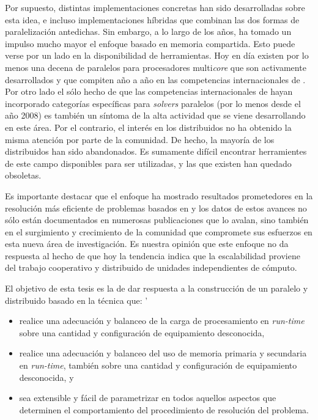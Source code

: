 \newcommand{\mcore}{multi\emph{core}\xspace}
\newcommand{\solvers}{\emph{solvers}\xspace}

Por supuesto, distintas implementaciones concretas han sido desarrolladas
sobre esta idea, e incluso implementaciones híbridas que combinan las dos
formas de paralelización antedichas. Sin embargo, a lo
largo de los años, ha tomado un impulso mucho mayor el enfoque basado en
memoria compartida. Esto puede verse por un lado en la disponibilidad de
herramientas. Hoy en día existen por lo menos una decena de \ssolvers
paralelos para procesadores \mcore que son activamente desarrollados y que
compiten año a año en las competencias internacionales de \ssolving. Por otro
lado el sólo hecho de que las competencias internacionales de \ssolving hayan
incorporado categorías específicas para \solvers paralelos (por lo menos desde
el año 2008) es también un síntoma de la alta actividad que se viene
desarrollando en este área. Por el contrario, el interés en los \ssolvers
distribuidos no ha obtenido la misma atención por parte de la comunidad. De
hecho, la mayoría de los \ssolvers distribuidos han sido abandonados. Es
sumamente difícil encontrar herramientes de este campo disponibles para ser
utilizadas, y las que existen han quedado obsoletas.

Es importante destacar que el enfoque \pfolio ha mostrado resultados
prometedores en la resolución más eficiente de problemas basados en \sat y los
datos de estos avances no sólo están documentados en numerosas publicaciones
que lo avalan, sino también en el surgimiento y crecimiento de la comunidad
que compromete sus esfuerzos en esta nueva área de investigación.
 Es nuestra opinión que este enfoque no da respuesta al hecho
de que hoy la tendencia indica que la escalabilidad proviene del trabajo
cooperativo y distribuido de unidades independientes de cómputo.

El objetivo de esta tesis es la de dar respuesta a la construcción de un \ssolver paralelo y distribuido basado en la técnica \gp que: '
\begin{itemize}
\item realice una adecuación y balanceo de la carga de procesamiento en \emph
{run-time} sobre una cantidad y configuración de equipamiento desconocida,
\item realice una adecuación y balanceo del uso de memoria primaria y
secundaria en \emph{run-time}, también sobre una cantidad y configuración de
equipamiento desconocida, y 
\item sea extensible y fácil de parametrizar en
todos aquellos aspectos que determinen el comportamiento del procedimiento de
resolución del problema. 
\end{itemize}

